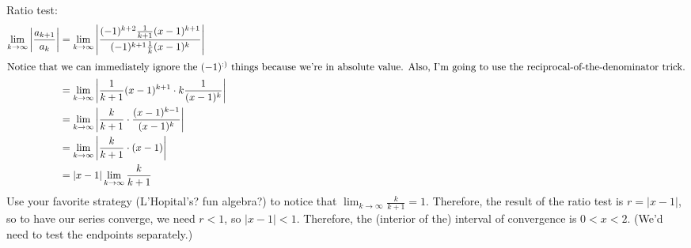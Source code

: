 \begin{enumerate}[leftmargin=0pt]
\begin{enumerate}
    \begin{red}
    Ratio test:
    \begin{align*}
        \lim_{k\to\infty} \left| \dfrac{a_{k+1}}{a_k} \right| &= 
        \lim_{k\to\infty} \left| \dfrac{(-1)^{k+2} \frac{1}{k+1} (x-1)^{k+1}}{(-1)^{k+1} \frac{1}{k} (x-1)^k} \right| \\
        \intertext{Notice that we can immediately ignore the $(-1)^\text{:)}$ things because we're in absolute value. Also, I'm going to use the reciprocal-of-the-denominator trick.}
        &= \lim_{k\to\infty} \left| \frac{1}{k+1} (x-1)^{k+1} \cdot k\frac{1}{(x-1)^k}  \right| \\
        &= \lim_{k\to\infty} \left| \frac{k}{k+1} \cdot \frac{(x-1)^{k-1}}{(x-1)^k} \right| \\
        &= \lim_{k\to\infty} \left| \frac{k}{k+1} \cdot (x-1) \right| \\
        &= |x-1|\lim_{k\to\infty} \frac{k}{k+1}
    \end{align*}
    Use your favorite strategy (L'Hopital's? fun algebra?) to notice that $\lim_{k\to\infty} \frac{k}{k+1} = 1$. Therefore, the result of the ratio test is $r = |x-1|$, so to have our series converge, we need $r < 1$, so $|x-1| < 1$. Therefore, the (interior of the) interval of convergence is $0 < x < 2$. (We'd need to test the endpoints separately.)
    \end{red}
\end{enumerate}


\end{enumerate}
